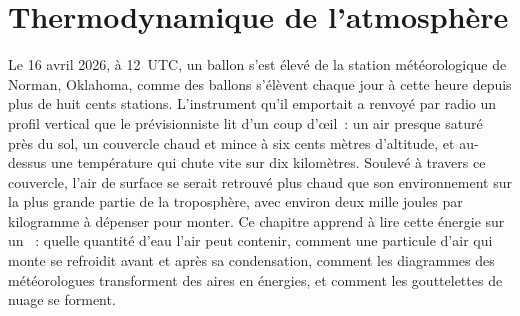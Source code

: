 \chapter{Thermodynamique de l'atmosphère}\label{ch:b2:atmospheric-thermodynamics}

Le 16 avril 2026, à 12~UTC, un ballon s'est élevé de la station météorologique de Norman, Oklahoma, comme des
ballons s'élèvent chaque jour à cette heure depuis plus de huit cents stations. L'instrument qu'il emportait a
renvoyé par radio un profil vertical que le prévisionniste lit d'un coup d'œil~: un air presque saturé près du
sol, un couvercle chaud et mince à six cents mètres d'altitude, et au-dessus une température qui chute vite
sur dix kilomètres. Soulevé à travers ce couvercle, l'air de surface se serait retrouvé plus chaud que son
environnement sur la plus grande partie de la troposphère, avec environ deux mille joules par kilogramme à dépenser
pour monter. Ce chapitre apprend à lire cette énergie sur un ~: quelle quantité d'eau l'air peut
contenir, comment une particule d'air qui monte se refroidit avant et après sa condensation, comment les
diagrammes des météorologues transforment des aires en énergies, et comment les gouttelettes de nuage se forment.

